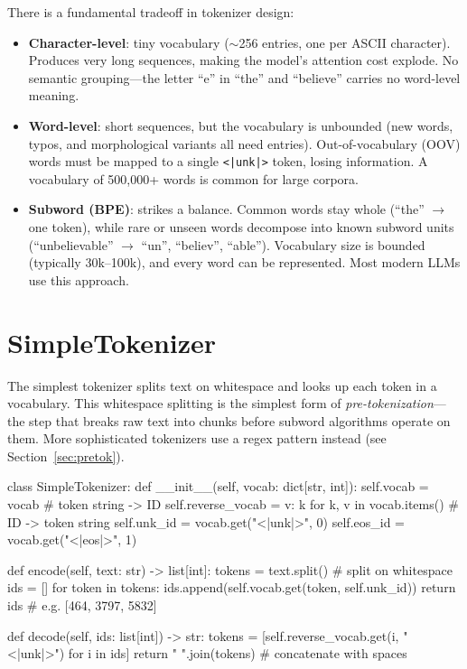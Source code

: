 \begin{keyconcept}
  There is a fundamental tradeoff in tokenizer design:
  \begin{itemize}
    \item \textbf{Character-level}: tiny vocabulary ($\sim$256 entries, one per
          ASCII character). Produces very long sequences, making the model's
          attention cost explode. No semantic grouping---the letter ``e'' in
          ``the'' and ``believe'' carries no word-level meaning.
    \item \textbf{Word-level}: short sequences, but the vocabulary is
          unbounded (new words, typos, and morphological variants all need
          entries). Out-of-vocabulary (OOV) words must be mapped to a single
          \texttt{<|unk|>} token, losing information. A vocabulary of 500{,}000+
          words is common for large corpora.
    \item \textbf{Subword (BPE)}: strikes a balance. Common words stay whole
          (``the'' $\rightarrow$ one token), while rare or unseen words decompose
          into known subword units (``unbelievable'' $\rightarrow$
          ``un'', ``believ'', ``able''). Vocabulary size is bounded
          (typically 30k--100k), and every word can be represented. Most modern
          LLMs use this approach.
  \end{itemize}
\end{keyconcept}

\section{SimpleTokenizer}

The simplest tokenizer splits text on whitespace and looks up each token
in a vocabulary. This whitespace splitting is the simplest form of
\emph{pre-tokenization}---the step that breaks raw text into chunks before
subword algorithms operate on them. More sophisticated tokenizers use a
regex pattern instead (see Section~\ref{sec:pretok}).

\begin{pseudocode}
class SimpleTokenizer:
    def __init__(self, vocab: dict[str, int]):
        self.vocab = vocab                          # token string -> ID
        self.reverse_vocab = {v: k for k, v in vocab.items()}  # ID -> token string
        self.unk_id = vocab.get("<|unk|>", 0)
        self.eos_id = vocab.get("<|eos|>", 1)

    def encode(self, text: str) -> list[int]:
        tokens = text.split()                      # split on whitespace
        ids = []
        for token in tokens:
            ids.append(self.vocab.get(token, self.unk_id))
        return ids                                 # e.g. [464, 3797, 5832]

    def decode(self, ids: list[int]) -> str:
        tokens = [self.reverse_vocab.get(i, "<|unk|>") for i in ids]
        return " ".join(tokens)                    # concatenate with spaces
\end{pseudocode}

